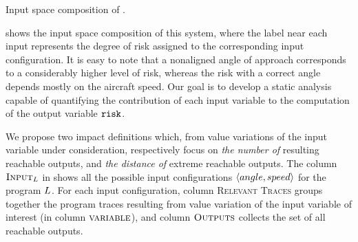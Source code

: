 \begin{marginfigure}
\centering
{}
\caption{Input space composition of .}
\end{marginfigure}

 shows the input space composition of this system, where the label near each input represents the degree of risk assigned to the corresponding input configuration.
It is easy to note that a nonaligned angle of approach corresponds to a considerably higher level of risk, whereas the risk with a correct angle depends mostly on the aircraft speed.
Our goal is to develop a static analysis capable of quantifying the contribution of each input variable to the computation of the output variable $\texttt{risk}{}$.


\newcommand{\exampleinput}[1][\defaultprogramexampleletter]{\textsc{Input}_{#1}}

We propose two impact definitions which, from value variations of the input variable under consideration, respectively focus on
\textit{the number of} resulting reachable outputs, and \textit{the distance of} extreme reachable outputs.
The column $\exampleinput[\landingprogram]$ in  shows all the possible input configurations $\langle angle, speed \rangle$ for the program $L$.
For each input configuration, column \textsc{Relevant Traces} groups together the program traces resulting from value variation of the input variable of interest (in column $\textsc{variable}$), and column $\textsc{Outputs}$ collects the set of all reachable outputs.

